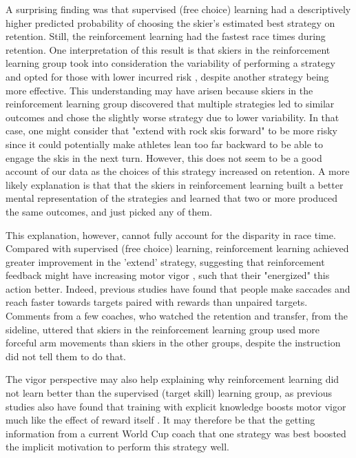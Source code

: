 A surprising finding was that supervised (free choice) learning had a descriptively higher predicted probability of choosing the skier's estimated best strategy on retention. Still, the reinforcement learning had the fastest race times during retention. One interpretation of this result is that skiers in the reinforcement learning group took into consideration the variability of performing a strategy and opted for those with lower incurred risk \cite{braun_risk-sensitivity_2011, wolpert_motor_2010}, despite another strategy being more effective. This understanding may have arisen because skiers in the reinforcement learning group discovered that multiple strategies led to similar outcomes and chose the slightly worse strategy due to lower variability. In that case, one might consider that "extend with rock skis forward" to be more risky since it could potentially make athletes lean too far backward to be able to engage the skis in the next turn. However, this does not seem to be a good account of our data as the choices of this strategy increased on retention. A more likely explanation is that that the skiers in reinforcement learning built a better mental representation of the strategies and learned that two or more produced the same outcomes, and just picked any of them.

This explanation, however, cannot fully account for the disparity in race time. Compared with supervised (free choice) learning, reinforcement learning achieved greater improvement in the 'extend' strategy, suggesting that reinforcement feedback might have increasing motor vigor \cite{pietro_mazzoni_why_2007, dudman_basal_2016}, such that their "energized" this action better. Indeed, previous studies have found that people make saccades \cite{takikawa_modulation_2002} and reach\cite{summerside_vigor_2018} faster towards targets paired with rewards than unpaired targets. Comments from a few coaches, who watched the retention and transfer, from the sideline, uttered that skiers in the reinforcement learning group used more forceful arm movements than skiers in the other groups, despite the instruction did not tell them to do that.

The vigor perspective may also help explaining why reinforcement learning did not learn better than the supervised (target skill) learning group, as previous studies also have found that training with explicit knowledge boosts motor vigor much like the effect of reward itself \cite{anderson_rewards_2020, wong_explicit_2015}. It may therefore be that the getting information from a current World Cup coach that one strategy was best boosted the implicit motivation to perform this strategy well. 

